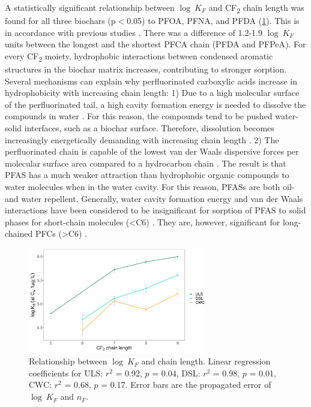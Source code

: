 A statistically significant relationship between $\log~K_F$ and CF\textsubscript{2} chain length was found for all three biochars (p$<$0.05) to PFOA, PFNA, and PFDA (\cref{fig:chainlength}). This is in accordance with previous studies \citep{Sorengard2019, higgins2006sorption, ahmed2020per}. There was a difference of 1.2-1.9 $\log~K_F$ units between the longest and the shortest PFCA chain (PFDA and PFPeA). For every CF\textsubscript{2} moiety, hydrophobic interactions between condensed aromatic structures in the biochar matrix increases, contributing to stronger sorption. Several mechanisms can explain why perfluorinated carboxylic acids increase in hydrophobicity with increasing chain length: 1) Due to a high molecular surface of the perfluorinated tail, a high cavity formation energy is needed to dissolve the compounds in water \citep{Arp2006}. For this reason, the compounds tend to be pushed water-solid interfaces, such as a biochar surface. Therefore, dissolution becomes increasingly energetically demanding with increasing chain length \citep{sigmund2022sorption}. 2) The perfluorinated chain is capable of the lowest van der Waals dispersive forces per molecular surface area compared to a hydrocarbon chain \citep{du2014adsorption}. The result is that PFAS has a much weaker attraction than hydrophobic organic compounds to water molecules when in the water cavity. For this reason, PFASs are both oil- and water repellent.  Generally, water cavity formation energy and van der Waals interactions have been considered to be insignificant for sorption of PFAS to solid phases for short-chain molecules (\textless C6) \citep{du2014adsorption}. They are, however, significant for long-chained PFCs (\textgreater C6) \citep{du2014adsorption}.

\begin{figure}[tbh]
    \centering
    \includegraphics[width=0.7\textwidth]{R/figs/chain_length_Kd1ugL_plot.pdf}
    \caption{Relationship between $\log~K_F$ and chain length. Linear regression coefficients for ULS: $r^2$ = 0.92, $p$ = 0.04, DSL: $r^2$ = 0.98, $p$ = 0.01, CWC: $r^2$ = 0.68, $p$ = 0.17. Error bars are the propagated error of $\log~K_F$ and $n_F$.}
    \label{fig:chainlength}
\end{figure}

